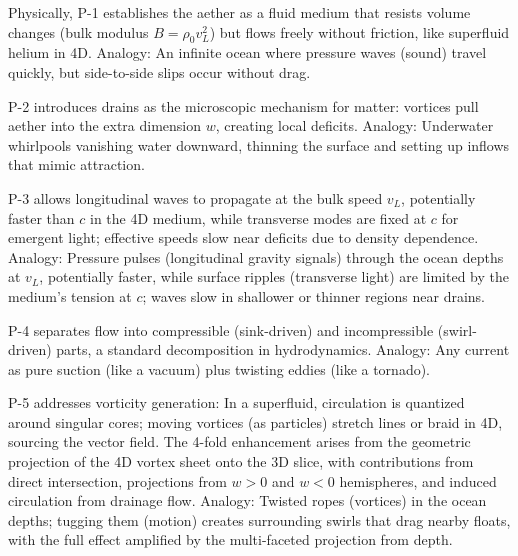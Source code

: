 \documentclass{article}
\begin{document}

Physically, P-1 establishes the aether as a fluid medium that resists volume changes (bulk modulus $B = \rho_0 v_L^2$) but flows freely without friction, like superfluid helium in 4D. Analogy: An infinite ocean where pressure waves (sound) travel quickly, but side-to-side slips occur without drag.

P-2 introduces drains as the microscopic mechanism for matter: vortices pull aether into the extra dimension $w$, creating local deficits. Analogy: Underwater whirlpools vanishing water downward, thinning the surface and setting up inflows that mimic attraction.

P-3 allows longitudinal waves to propagate at the bulk speed $v_L$, potentially faster than $c$ in the 4D medium, while transverse modes are fixed at $c$ for emergent light; effective speeds slow near deficits due to density dependence. Analogy: Pressure pulses (longitudinal gravity signals) through the ocean depths at $v_L$, potentially faster, while surface ripples (transverse light) are limited by the medium's tension at $c$; waves slow in shallower or thinner regions near drains.

P-4 separates flow into compressible (sink-driven) and incompressible (swirl-driven) parts, a standard decomposition in hydrodynamics. Analogy: Any current as pure suction (like a vacuum) plus twisting eddies (like a tornado).

P-5 addresses vorticity generation: In a superfluid, circulation is quantized around singular cores; moving vortices (as particles) stretch lines or braid in 4D, sourcing the vector field. The 4-fold enhancement arises from the geometric projection of the 4D vortex sheet onto the 3D slice, with contributions from direct intersection, projections from $w>0$ and $w<0$ hemispheres, and induced circulation from drainage flow. Analogy: Twisted ropes (vortices) in the ocean depths; tugging them (motion) creates surrounding swirls that drag nearby floats, with the full effect amplified by the multi-faceted projection from depth.
\end{document}
